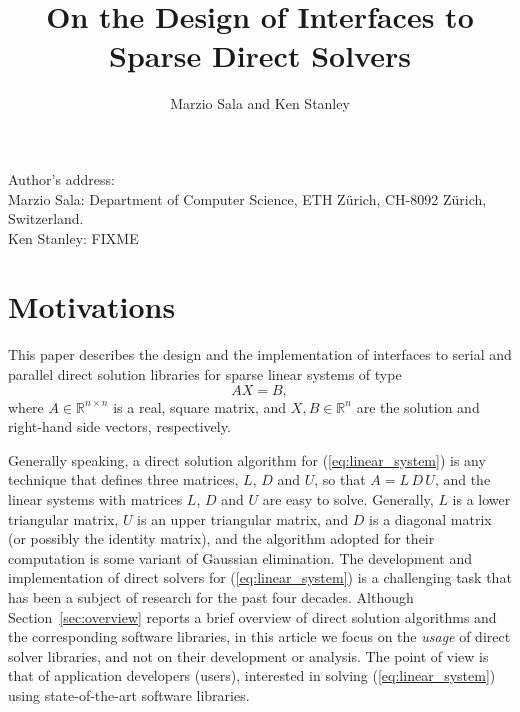 \documentclass[acmtocl]{acmtrans2m}
\title{On the Design of Interfaces to Sparse Direct Solvers}
\author{Marzio Sala and Ken Stanley}
\begin{document}
\setcounter{page}{1}

\begin{bottomstuff}
Author's address:   \\
Marzio Sala: Department of Computer Science, ETH Z\"urich, CH-8092 Z\"urich,
  Switzerland. \\
Ken Stanley: FIXME
\end{bottomstuff}

\maketitle

\section{Motivations}
\label{sec:introduction}

This paper describes the design and the implementation of 
interfaces to serial and parallel direct solution libraries for
sparse linear systems of type
\begin{equation}
  \label{eq:linear_system}
  A X = B,
\end{equation}
where $A \in \mathbb{R}^{n \times n}$ is a real, square matrix, 
  and $X, B \in \mathbb{R}^{n}$ are the solution and
right-hand side vectors, respectively. 

Generally speaking,
a direct solution algorithm for (\ref{eq:linear_system}) is any 
technique that defines three matrices, $L$, $D$ and $U$, so that
$A = L \, D \, U$, and the linear systems with matrices $L$, $D$ and $U$ are
easy to solve. Generally, $L$ is a lower triangular matrix, $U$ is an
upper triangular matrix, and $D$ is a diagonal matrix 
(or possibly the identity matrix), and the algorithm adopted for their
computation is some variant of Gaussian elimination. 
The development and implementation of
direct solvers for (\ref{eq:linear_system}) is a
challenging task that has been a subject of research for the
past four decades. Although
Section~\ref{sec:overview} reports a brief overview of direct solution algorithms and
the corresponding software libraries, in
this article we focus on the {\sl usage} of direct solver libraries, and not
on their development or analysis. The point of view is that
of application developers (users), interested in solving
(\ref{eq:linear_system}) using state-of-the-art software libraries.  
\end{document}
